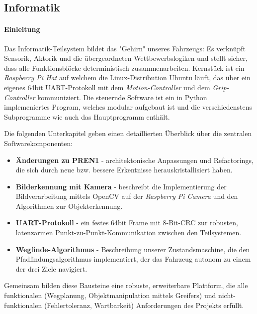 \documentclass[main.tex]{subfiles} %
\begin{document}
\subsection{Informatik}

\paragraph{Einleitung}

Das Informatik-Teilsystem bildet das "Gehirn" unseres Fahrzeugs:
Es verknüpft Sensorik, Aktorik und die übergeordneten
Wettbewerbslogiken und stellt sicher, dass alle Funktionsblöcke
deterministisch zusammenarbeiten.
Kernstück ist ein \emph{Raspberry Pi Hat} auf welchem die
Linux-Distribution Ubuntu läuft, das über ein
eigenes 64bit UART-Protokoll mit dem \emph{Motion-Controller}
und dem \emph{Grip-Controller} kommuniziert.
Die steuernde Software ist ein in Python implemeniertes Program, welches modular
aufgebaut ist und die verschiedenstens Subprogramme wie auch das
Hauptprogramm enthält.

Die folgenden Unterkapitel geben einen detaillierten Überblick über
die zentralen Softwarekomponenten:

\begin{itemize}\setlength\itemsep{0.3em}
  \item \textbf{Änderungen zu PREN1} - architektonische Anpassungen
    und Refactorings, die sich durch neue bzw. bessere Erkentnisse
    herauskristallisiert haben.
  \item \textbf{Bilderkennung mit Kamera} - beschreibt die Implementierung
    der Bildverarbeitung mittels OpenCV auf der \emph{Raspberry Pi
    Camera} und den Algorithmen zur Objekterkennung.
  \item \textbf{UART-Protokoll} - ein festes 64bit Frame mit
    8-Bit-CRC zur robusten, latenzarmen Punkt-zu-Punkt-Kommunikation
    zwischen den Teilsystemen.
  \item \textbf{Wegfinde-Algorithmus} - Beschreibung unserer
    Zustandsmaschine, die den Pfadfindungsalgorithmus implementiert,
    der das Fahrzeug autonom zu einem der drei Ziele navigiert.
\end{itemize}

Gemeinsam bilden diese Bausteine eine robuste, erweiterbare
Plattform, die alle funktionalen (Wegplanung, Objektmanipulation
mittels Greifers) und
nicht-funktionalen (Fehlertoleranz, Wartbarkeit)
Anforderungen des Projekts erfüllt.


\newpage


\newpage


\newpage


\newpage
\end{document}
